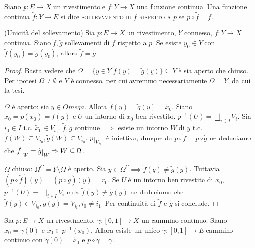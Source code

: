 \begin{defn}
  Siano $p: E \longrightarrow X$ un rivestimento e $f: Y \longrightarrow X$ una funzione continua. Una funzione continua $\tilde{f}: Y \longrightarrow E$ si dice \textsc{sollevamento di $f$ rispetto a $p$} se $p \circ \tilde{f}=f$.
\end{defn}

\begin{prop} \label{unic_soll}
  (Unicità del sollevamento)
  Sia $p: E \longrightarrow X$ un rivestimento, $Y$ connesso, $f: Y \longrightarrow X$ continua. Siano $\tilde{f}, \tilde{g}$ sollevamenti di $f$ rispetto a $p$. Se esiste $y_0 \in Y$ con $\tilde{f}(y_0)=\tilde{g}(y_0)$, allora $\tilde{f}=\tilde{g}$.
\end{prop}

\begin{proof}
  Basta vedere che $\Omega=\{ y \in Y | \tilde{f}(y)=\tilde{g}(y)\} \subseteq Y$ è sia aperto che chiuso. Per ipotesi $\Omega \not= \emptyset$ e $Y$ è connesso, per cui avremmo necessariamente $\Omega=Y$, da cui la tesi.

  $\Omega$ è aperto: sia $y \in Omega$. Allora $\tilde{f}(y)=\tilde{g}(y)=\tilde{x}_0$. Siano $x_0=p(\tilde{x}_0)=f(y)$ e $U$ un intorno di $x_0$ ben rivestito.
  $\displaystyle p^{-1}(U)=\bigsqcup_{i \in I} V_i$. Sia $i_0 \in I$ t.c. $\tilde{x}_0 \in V_{i_0}$.
  $\tilde{f}, \tilde{g}$ continue $\implies$ esiste un intorno $W$ di $y$ t.c. $\tilde{f}(W) \subseteq V_{i_0}, \tilde{g}(W) \subseteq V_{i_0}$.
  $p \restrict{V_{i_0}}$ è iniettiva, dunque da $p \circ \tilde{f}=p \circ \tilde{g}$ ne deduciamo che $\tilde{f} \restrict{W}=\tilde{g} \restrict{W} \implies W \subseteq \Omega$.

  $\Omega$ chiuso: $\Omega^C=Y \setminus \Omega$ è aperto. Sia $y \in \Omega^C \implies \tilde{f}(y) \not= \tilde{g}(y)$. Tuttavia $(p \circ \tilde{f})(y)=(p \circ \tilde{g})(y)=x_0$.
  Se $U$ è un intorno ben rivestito di $x_0$, $\displaystyle p^{-1}(U)=\bigsqcup_{i \in I} V_i$ e da $\tilde{f}(y) \not= \tilde{g}(y)$ ne deduciamo che $\tilde{f}(y) \in V_{i_0}, \tilde{g}(y)=V_{i_1}, i_0 \not= i_1$. Per continuità di $\tilde{f}$ e $\tilde{g}$ si conclude.
\end{proof}

\begin{thm}
  Sia $p:E \longrightarrow X$ un rivestimento, $\gamma:[0, 1] \longrightarrow X$ un cammino continuo. Siano $x_0=\gamma(0)$ e $\tilde{x}_0 \in p^{-1}(x_0)$.
  Allora esiste un unico $\tilde{\gamma}:[0, 1] \longrightarrow E$ cammino continuo con $\tilde{\gamma}(0)=\tilde{x}_0$ e $p \circ \tilde{\gamma}=\gamma$.
\end{thm}

